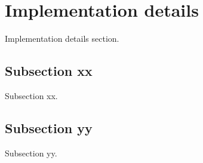 \section{Implementation details}
Implementation details section.

\subsection{Subsection xx}
Subsection xx.

\subsection{Subsection yy}
Subsection yy.

